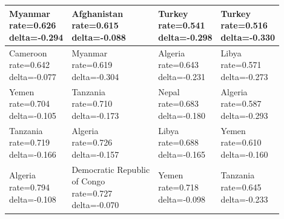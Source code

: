 \documentclass[runningheads]{llncs}
\begin{document}
{\begin{longtable}{p{}p{}p{}p{}}
\hline
\shortstack[l]{Myanmar\\ rate=0.626\\ delta=-0.294} &\shortstack[l]{Afghanistan\\ rate=0.615\\ delta=-0.088} &\shortstack[l]{Turkey\\ rate=0.541\\ delta=-0.298} &\shortstack[l]{Turkey\\ rate=0.516\\ delta=-0.330} \\
\hline
\shortstack[l]{Cameroon\\ rate=0.642\\ delta=-0.077} &\shortstack[l]{Myanmar\\ rate=0.619\\ delta=-0.304} &\shortstack[l]{Algeria\\ rate=0.643\\ delta=-0.231} &\shortstack[l]{Libya\\ rate=0.571\\ delta=-0.273} \\
\hline
\shortstack[l]{Yemen\\ rate=0.704\\ delta=-0.105} &\shortstack[l]{Tanzania\\ rate=0.710\\ delta=-0.173} &\shortstack[l]{Nepal\\ rate=0.683\\ delta=-0.180} &\shortstack[l]{Algeria\\ rate=0.587\\ delta=-0.293} \\
\hline
\shortstack[l]{Tanzania\\ rate=0.719\\ delta=-0.166} &\shortstack[l]{Algeria\\ rate=0.726\\ delta=-0.157} &\shortstack[l]{Libya\\ rate=0.688\\ delta=-0.165} &\shortstack[l]{Yemen\\ rate=0.610\\ delta=-0.160} \\
\hline
\shortstack[l]{Algeria\\ rate=0.794\\ delta=-0.108} &\shortstack[l]{Democratic Republic\\ of Congo\\ rate=0.727\\ delta=-0.070} &\shortstack[l]{Yemen\\ rate=0.718\\ delta=-0.098} &\shortstack[l]{Tanzania\\ rate=0.645\\ delta=-0.233} \\

\end{longtable}}
\end{document}
